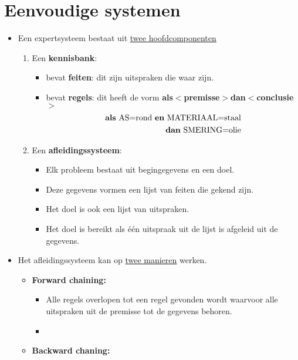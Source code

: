 \section{Eenvoudige systemen}
\begin{itemize}
	\item Een expertsysteem bestaat uit \underline{twee hoofdcomponenten}
	\begin{enumerate}
		\item Een \textbf{kennisbank}:
		\begin{itemize}
			\item bevat \textbf{feiten}: dit zijn uitspraken die waar zijn.
			\item bevat \textbf{regels}: dit heeft de vorm \textbf{als$<$premisse$>$dan$<$conclusie$>$}
			\begin{equation*}
				\begin{split}
					\hbox{\textbf{als} AS=rond \textbf{en} MATERIAAL=staal} \\
					\hbox{\textbf{dan} SMERING=olie} 
				\end{split}
			\end{equation*}
		\end{itemize}
		\item Een \textbf{afleidingssysteem}:
		\begin{itemize}
			\item Elk probleem bestaat uit begingegevens en een doel.
			\item Deze gegevens vormen een lijst van feiten die gekend zijn.
			\item Het doel is ook een lijst van uitspraken.
			\item Het doel is bereikt als één uitspraak uit de lijst is afgeleid uit de gegevens.
		\end{itemize}
	\end{enumerate}
	\item Het afleidingssysteem kan op \underline{twee manieren} werken.
	\begin{itemize}
		\item \textbf{Forward chaining:}
		\begin{itemize}
			\item Alle regels overlopen tot een regel gevonden wordt waarvoor alle uitspraken uit de premisse tot de gegevens behoren.
			\item 
		\end{itemize}
		
		\item \textbf{Backward chaning:}
	\end{itemize}
\end{itemize}
